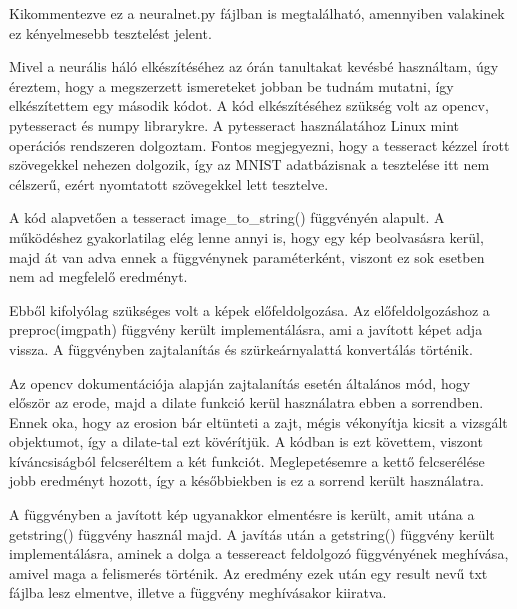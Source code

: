 \documentclass[hidelinks,12pt,a4paper]{report}
\begin{document}

Kikommentezve ez a neuralnet.py fájlban is megtalálható, amennyiben valakinek ez kényelmesebb tesztelést jelent.


Mivel a neurális háló elkészítéséhez az órán tanultakat kevésbé használtam, úgy éreztem, hogy a megszerzett ismereteket jobban be tudnám mutatni, így elkészítettem egy második kódot.
A kód elkészítéséhez szükség volt az opencv, pytesseract és numpy librarykre. A pytesseract használatához Linux mint operációs rendszeren dolgoztam. Fontos megjegyezni, hogy a tesseract kézzel írott szövegekkel nehezen dolgozik, így az MNIST adatbázisnak a tesztelése itt nem célszerű, ezért nyomtatott szövegekkel lett tesztelve.

A kód alapvetően a tesseract image\_to\_string() függvényén alapult. A működéshez gyakorlatilag elég lenne annyi is, hogy egy kép beolvasásra kerül, majd át van adva ennek a függvénynek paraméterként, viszont ez sok esetben nem ad megfelelő eredményt.

Ebből kifolyólag szükséges volt a képek előfeldolgozása.
Az előfeldolgozáshoz a preproc(imgpath) függvény került implementálásra, ami a javított képet adja vissza.
A függvényben zajtalanítás és szürkeárnyalattá konvertálás történik.


Az opencv dokumentációja alapján zajtalanítás esetén általános mód, hogy először az erode, majd a dilate funkció kerül használatra ebben a sorrendben.
Ennek oka, hogy az erosion bár eltünteti a zajt, mégis vékonyítja kicsit a vizsgált objektumot, így a dilate-tal ezt kövérítjük.
A kódban is ezt követtem, viszont kíváncsiságból felcseréltem a két funkciót. Meglepetésemre a kettő felcserélése jobb eredményt hozott, így a későbbiekben is ez a sorrend került használatra.


A függvényben a javított kép ugyanakkor elmentésre is került, amit utána a getstring() függvény használ majd.
A javítás után a getstring() függvény került implementálásra, aminek a dolga a tessereact feldolgozó függvényének meghívása, amivel maga a felismerés történik.  Az eredmény ezek után egy result nevű txt fájlba lesz elmentve, illetve a függvény meghívásakor kiiratva.
\end{document}
